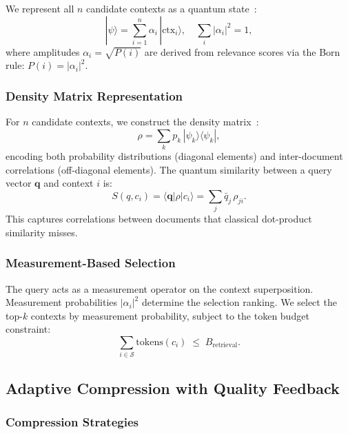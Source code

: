 \documentclass[journal]{IEEEtran}
\newcommand{\abs}[1]{\left|#1\right|}
\newcommand{\ket}[1]{|#1\rangle}
\newcommand{\bra}[1]{\langle #1|}
\begin{document}
We represent all $n$ candidate contexts as a quantum
state~\cite{vanrijsbergen2004}:
\begin{equation}
  \ket{\psi} = \sum_{i=1}^{n} \alpha_i\, \ket{\mathrm{ctx}_i},
  \quad
  \sum_{i} \abs{\alpha_i}^{2} = 1,
  \label{eq:superposition}
\end{equation}
where amplitudes $\alpha_i = \sqrt{P(i)}$ are derived from relevance scores
via the Born rule: $P(i) = \abs{\alpha_i}^{2}$.

\subsubsection{Density Matrix Representation}

For $n$ candidate contexts, we construct the density
matrix~\cite{zuccon2009}:
\begin{equation}
  \rho = \sum_{k} p_k\, \ket{\psi_k}\bra{\psi_k},
  \label{eq:density}
\end{equation}
encoding both probability distributions (diagonal elements) and
inter-document correlations (off-diagonal elements).  The quantum
similarity between a query vector $\mathbf{q}$ and context $i$ is:
\begin{equation}
  S(q, c_i) = \bra{\mathbf{q}}\rho\ket{c_i}
            = \sum_{j} \bar{q}_j\, \rho_{ji}.
  \label{eq:qsim}
\end{equation}
This captures correlations between documents that classical dot-product
similarity misses.

\subsubsection{Measurement-Based Selection}

The query acts as a measurement operator on the context superposition.
Measurement probabilities $\abs{\alpha_i}^{2}$ determine the selection
ranking.  We select the top-$k$ contexts by measurement probability,
subject to the token budget constraint:
\begin{equation}
  \sum_{i \in \mathcal{S}}
    \mathrm{tokens}(c_i) \;\leq\; B_{\mathrm{retrieval}}.
  \label{eq:budget-constraint}
\end{equation}

\subsection{Adaptive Compression with Quality Feedback}
\label{sec:compression}

\subsubsection{Compression Strategies}
\end{document}
